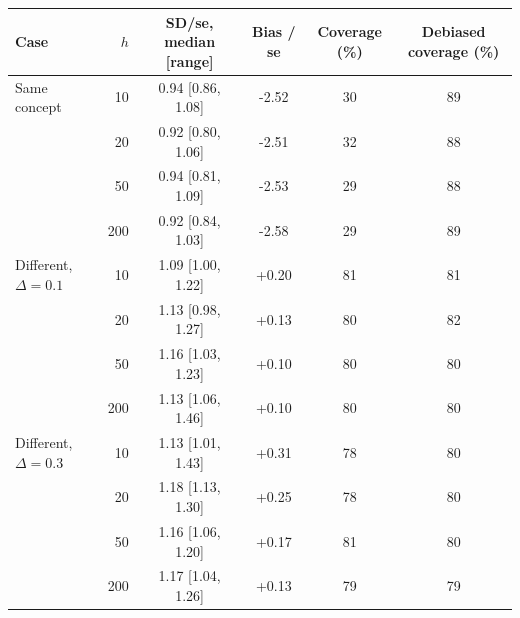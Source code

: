 \scriptsize
\begin{tabular}{lrcccc}
\toprule
Case & $h$ & SD/se, median [range] & Bias / se & Coverage (\%) & Debiased coverage (\%) \\
\midrule
Same concept & 10 & 0.94 [0.86, 1.08] & -2.52 & 30 & 89 \\
 & 20 & 0.92 [0.80, 1.06] & -2.51 & 32 & 88 \\
 & 50 & 0.94 [0.81, 1.09] & -2.53 & 29 & 88 \\
 & 200 & 0.92 [0.84, 1.03] & -2.58 & 29 & 89 \\
Different, $\Delta=0.1$ & 10 & 1.09 [1.00, 1.22] & +0.20 & 81 & 81 \\
 & 20 & 1.13 [0.98, 1.27] & +0.13 & 80 & 82 \\
 & 50 & 1.16 [1.03, 1.23] & +0.10 & 80 & 80 \\
 & 200 & 1.13 [1.06, 1.46] & +0.10 & 80 & 80 \\
Different, $\Delta=0.3$ & 10 & 1.13 [1.01, 1.43] & +0.31 & 78 & 80 \\
 & 20 & 1.18 [1.13, 1.30] & +0.25 & 78 & 80 \\
 & 50 & 1.16 [1.06, 1.20] & +0.17 & 81 & 80 \\
 & 200 & 1.17 [1.04, 1.26] & +0.13 & 79 & 79 \\
\bottomrule
\end{tabular}
